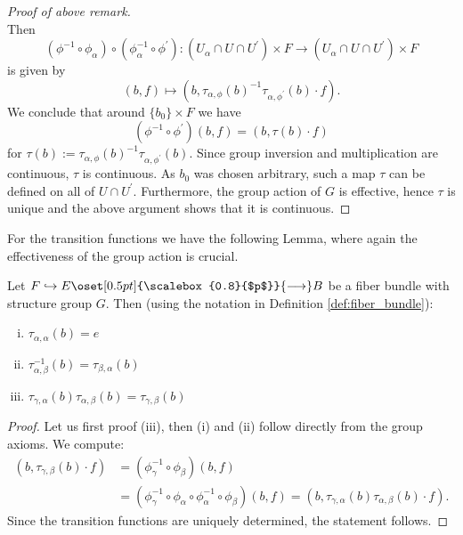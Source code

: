 \begin{remark}
\begin{proof}[Proof of above remark]
\[        \]
        Then
        \[
        (\phi^{-1} \circ \phi_\alpha) \circ (\phi_\alpha^{-1} \circ \phi^\prime) \colon (U_\alpha \cap U \cap U^\prime) \times F \to (U_\alpha \cap U \cap U^\prime) \times F 
        \]
        is given by
        \[
        (b,f) \mapsto (b, \tau_{\alpha,\phi}(b)^{-1}\tau_{\alpha,\phi^\prime}(b) \cdot f).
        \]
        We conclude that around $\{b_0\} \times F$ we have
        \[
        (\phi^{-1} \circ \phi^\prime)(b,f) = (b,\tau(b) \cdot f)
        \]
        for $\tau(b) := \tau_{\alpha,\phi}(b)^{-1}\tau_{\alpha,\phi^\prime}(b)$. Since group inversion and multiplication are continuous, $\tau$ is continuous. As $b_0$ was chosen arbitrary, such a map $\tau$ can be defined on all of $U \cap U^\prime$. Furthermore, the group action of $G$ is effective, hence $\tau$ is unique and the above argument shows that it is continuous. 
    \end{proof}
\end{remark}

    For the transition functions we have the following Lemma, where again the effectiveness of the group action is crucial.

    \begin{lemma}
        \label{lem:transition_functions}
        Let $F \hookrightarrow E \oset[0.5pt]{\scalebox{0.8}{$p$}}{\longrightarrow} B$ be a fiber bundle with structure group $G$. Then (using the notation in Definition \ref{def:fiber_bundle}):
        \begin{enumerate}[(i)]
            \item $\tau_{\alpha,\alpha}(b) = e$
            \item $\tau_{\alpha,\beta}^{-1}(b) = \tau_{\beta,\alpha}(b)$
            \item $\tau_{\gamma,\alpha}(b)\tau_{\alpha,\beta}(b) = \tau_{\gamma,\beta}(b)$
        \end{enumerate}
    \end{lemma}
    \begin{proof}
        Let us first proof (iii), then (i) and (ii) follow directly from the group axioms. We compute:
        \begin{align*}
            (b,\tau_{\gamma,\beta}(b) \cdot f) & = (\phi_\gamma^{-1} \circ \phi_\beta)(b,f) \\ & = (\phi_\gamma^{-1} \circ \phi_\alpha \circ \phi_\alpha^{-1} \circ \phi_\beta)(b,f) = (b,\tau_{\gamma,\alpha}(b)\tau_{\alpha,\beta}(b) \cdot f).
        \end{align*}
        Since the transition functions are uniquely determined, the statement follows. 
    \end{proof}

